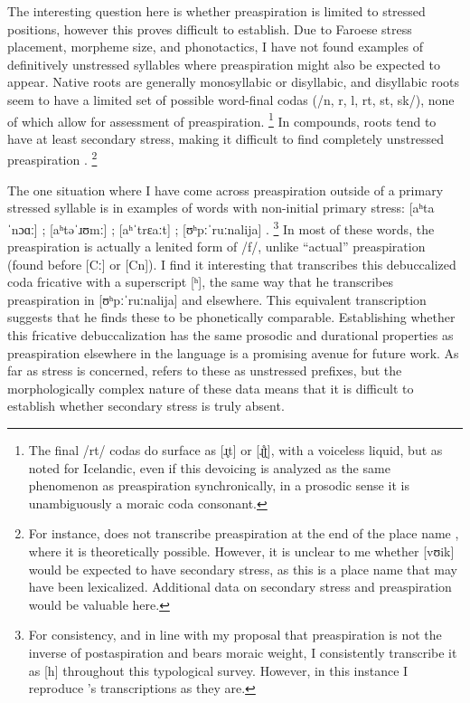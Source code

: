 \documentclass[output=paper,colorlinks,citecolor=brown]{langscibook}
\begin{document}
The interesting question here is whether preaspiration is limited to stressed positions, however this proves difficult to establish. Due to Faroese stress placement, morpheme size, and phonotactics, I have not found examples of definitively unstressed syllables where preaspiration might also be expected to appear. Native roots are generally monosyllabic or disyllabic, and disyllabic roots seem to have a limited set of possible word-final codas (/n, r, l, rt, st, sk/), none of which allow for assessment of preaspiration.%
\footnote{The final /rt/ codas do surface as [ɹ̥t] or [ɻ̊ʈ], with a voiceless liquid, but as noted for Icelandic, even if this devoicing is analyzed as the same phenomenon as preaspiration synchronically, in a prosodic sense it is unambiguously a moraic coda consonant.}
In compounds, roots tend to have at least secondary stress, making it difficult to find completely unstressed preaspiration \citep{lockwood1955}.%
\footnote{For instance, \citet{arnason2011} does not transcribe preaspiration at the end of the place name , where it is theoretically possible. However, it is unclear to me whether  [vʊik]  would be expected to have secondary stress, as this is a place name that may have been lexicalized. Additional data on secondary stress and preaspiration would be valuable here.}

The one situation where I have come across preaspiration outside of a primary stressed syllable is in examples of words with non-initial primary stress:  [aʰtaˈnɔɑː] ;  [aʰtəˈɹʊmː] ;  [aʰˈtrɛaːt] ;  [ʊʰpːˈruːnalija]  \citep[277]{arnason2011}.%
\footnote{For consistency, and in line with my proposal that preaspiration is not the inverse of postaspiration and bears moraic weight, I consistently transcribe it as [h] throughout this typological survey. However, in this instance I reproduce \citeauthor{arnason2011}'s transcriptions as they are.} 
In most of these words, the preaspiration is actually a lenited form of \hbox{/f/}, unlike ``actual'' preaspiration (found before [Cː] or [C{n}]). I find it interesting that \citet{arnason2011} transcribes this debuccalized coda fricative with a superscript [ʰ], the same way that he transcribes preaspiration in [ʊʰpːˈruːnalija] and elsewhere. This equivalent transcription suggests that he finds these to be phonetically comparable. Establishing whether this fricative debuccalization has the same prosodic and durational properties as preaspiration elsewhere in the language is a promising avenue for future work. As far as stress is concerned, \citet{arnason2011} refers to these as unstressed prefixes, but the morphologically complex nature of these data means that it is difficult to establish whether secondary stress is truly absent. 
\end{document}
